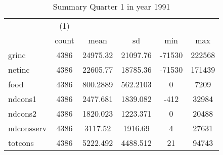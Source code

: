 \begin{table}[htbp]\centering
\def\sym#1{\ifmmode^{#1}\else\(^{#1}\)\fi}
\caption{Summary Quarter 1 in year 1991 \label{sum\_Q1\_y1991}}
\begin{tabular}{l*{1}{ccccc}}
\hline\hline
            &\multicolumn{1}{c}{(1)}&            &            &            &            \\
            &       count&        mean&          sd&         min&         max\\
\hline
grinc       &        4386&    24975.32&    21097.76&      -71530&      222568\\
netinc      &        4386&    22605.77&    18785.36&      -71530&      171439\\
food        &        4386&    800.2889&    562.2103&           0&        7209\\
ndcons1     &        4386&    2477.681&    1839.082&        -412&       32984\\
ndcons2     &        4386&    1820.023&    1223.371&           0&       20488\\
ndconsserv  &        4386&     3117.52&     1916.69&           4&       27631\\
totcons     &        4386&    5222.492&    4488.512&          21&       94743\\
\hline\hline
\end{tabular}
\end{table}
